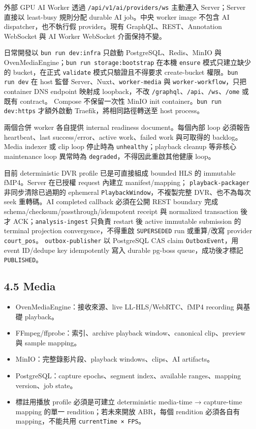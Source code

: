 \documentclass[
  9pt,
  a4paper,
]{article}
\providecommand{\tightlist}{%
  \setlength{\itemsep}{0pt}\setlength{\parskip}{0pt}}
\begin{document}
外部 GPU AI Worker 透過 \texttt{/api/v1/ai/providers/ws} 主動連入
Server；Server 直接以 least-busy 規則分配 durable AI job。中央 worker
image 不包含 AI dispatcher，也不執行假 provider。現有 GraphQL、REST、Annotation
WebSocket 與 AI Worker WebSocket 介面保持不變。

  日常開發以 \texttt{bun run dev:infra} 只啟動 PostgreSQL、Redis、MinIO 與
  OvenMediaEngine；\texttt{bun run storage:bootstrap} 在本機 \texttt{ensure}
  模式只建立缺少的 bucket，在正式 \texttt{validate} 模式只驗證且不得要求 create-bucket
  權限。\texttt{bun run dev} 在 host 監督 Server、Nuxt、\texttt{worker-media} 與
  \texttt{worker-workflow}，只把 container DNS endpoint 映射成 loopback，不改
  \texttt{/graphql}、\texttt{/api}、\texttt{/ws}、\texttt{/ome} 或既有 contract。
  Compose 不保留一次性 MinIO init container。\texttt{bun run dev:https}
  才額外啟動 Traefik，將相同路徑轉送至 host process。

  兩個合併 worker 各自提供 internal readiness document。每個內部 loop 必須報告
  heartbeat、last success/error、active work、failed work 與可取得的 backlog。Media
  indexer 或 clip loop 停止時為 \texttt{unhealthy}；playback cleanup 等非核心
  maintenance loop 異常時為 \texttt{degraded}，不得因此重啟其他健康 loop。

目前 deterministic DVR profile 已是可直接組成 bounded HLS 的 immutable
fMP4。Server 在已授權 request 內建立 manifest/mapping；
\texttt{playback-packager} 非同步清除已過期的 ephemeral
\texttt{PlaybackWindow}，不複製完整 DVR、也不為每次 seek 重轉碼。AI
completed callback 必須在公開 REST boundary 完成
schema/checksum/passthrough/idempotent receipt 與 normalized transaction
後才 ACK；\texttt{analysis-ingest} 只負責 restart 後 active immutable
submission 的 terminal projection convergence，不得重啟
\texttt{SUPERSEDED} run 或重算/改寫 provider \texttt{court\_pos}。
\texttt{outbox-publisher} 以 PostgreSQL CAS claim
\texttt{OutboxEvent}，用 event ID/dedupe key idempotently 寫入 durable
pg-boss queue，成功後才標記 \texttt{PUBLISHED}。

\subsection{4.5 Media}\label{45-media}

\begin{itemize}
\tightlist
\item
  OvenMediaEngine：接收來源、live LL-HLS/WebRTC、fMP4 recording 與基礎
  playback。
\item
  FFmpeg/ffprobe：索引、archive playback window、canonical clip、preview
  與 sample mapping。
\item
  MinIO：完整錄影片段、playback windows、clips、AI artifacts。
\item
  PostgreSQL：capture epochs、segment index、available ranges、mapping
  version、job state。
\item
  標註用播放 profile 必須是可建立 deterministic media-time →
  capture-time mapping 的單一 rendition；若未來開放 ABR，每個 rendition
  必須各自有 mapping，不能共用 \texttt{currentTime\ ×\ FPS}。
\end{itemize}
\end{document}
